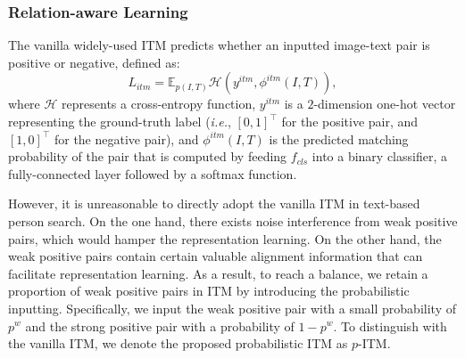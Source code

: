 \documentclass{article}
\begin{document}
\subsubsection{Relation-aware Learning}
The vanilla widely-used ITM predicts whether an inputted image-text pair is positive or negative, defined as:
\begin{equation}
    L_{itm} = \mathbb{E}_{p(I, T)}{\mathcal{H}}(y^{itm}, \phi^{itm}(I, T)), \label{equ1}
\end{equation}
where $\mathcal{H}$ represents a cross-entropy function, $y^{itm}$ is a $2$-dimension one-hot vector representing the ground-truth label (\emph{i.e.}, $\left[0, 1\right]^\top$ for the positive pair, and $\left[1, 0\right]^\top$ for the negative pair), and $\phi^{itm}(I, T)$ is the predicted matching probability of the pair that is computed by feeding $f_{cls}$ into a binary classifier, a fully-connected layer followed by a softmax function.

However, it is unreasonable to directly adopt the vanilla ITM in text-based person search.
On the one hand, there exists noise interference from weak positive pairs, which would hamper the representation learning.
On the other hand, the weak positive pairs contain certain valuable alignment information that can facilitate representation learning.
As a result, to reach a balance, we retain a proportion of weak positive pairs in ITM by introducing the probabilistic inputting.
Specifically, we input the weak positive pair with a small probability of $p^w$ and the strong positive pair with a probability of $1-p^w$.
To distinguish with the vanilla ITM, we denote the proposed probabilistic ITM as $p$-ITM.
\end{document}
